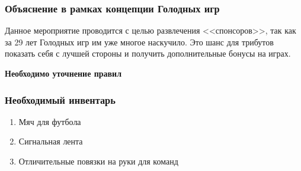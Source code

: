 
\subsubsection*{Объяснение в рамках концепции Голодных игр}
\par Данное мероприятие проводится с целью развлечения <<спонсоров>>, так как за 29 лет Голодных игр им уже многое наскучило. Это шанс для трибутов показать себя с лучшей стороны и получить дополнительные бонусы на играх.

\par \textbf{Необходимо уточнение правил}

\subsubsection*{Необходимый инвентарь}
\begin{enumerate}
\item Мяч для футбола
\item Сигнальная лента
\item Отличительные повязки на руки для команд
\end{enumerate}
